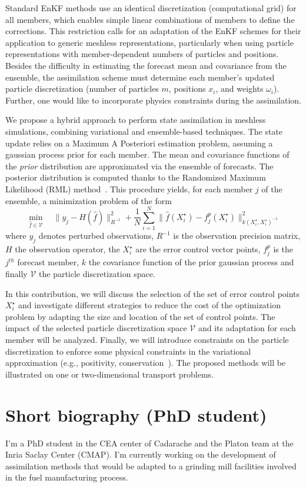 \documentclass[a4paper,10pt,oneside]{article}
\newcommand{\xs}{X^\star}
\begin{document}
Standard EnKF methods use an identical discretization (computational grid) for all members, which enables simple linear combinations of members to define the corrections. This restriction calls for an adaptation of the EnKF schemes for their application to generic meshless representations, particularly when using particle representations with member-dependent numbers of particles and positions. Besides the difficulty in estimating the forecast mean and covariance from the ensemble, the assimilation scheme must determine each member's updated particle discretization (number of particles $m$, positions $x_i$, and weights $\omega_i$). Further, one would like to incorporate physics constraints during the assimilation.

We propose a hybrid approach to perform state assimilation in meshless simulations, combining variational and ensemble-based techniques. The state update relies on a Maximum A Posteriori estimation problem, assuming a gaussian process prior for each member.
The mean and covariance functions of the \textit{prior} distribution are approximated via the ensemble of forecasts. The posterior distribution is computed thanks to the Randomized Maximum Likelihood (RML) method~\cite{evensen_data_2022}. This procedure yields, for each member $j$ of the ensemble, a minimization problem of the form
\begin{equation*}
  \min_{\hat{f} \in \mathcal{V}} \quad \|y_j - H(\hat{f})\|_{R^{-1}}^2 + \frac{1}{N} \sum_{i=1}^N \|\hat{f}(\xs_i)- f^p_{j}(\xs_i)\|^2_{k(\xs_i,\xs_i)^{-1}}
\end{equation*}
where $y_j$ denotes perturbed observations, $R^{-1}$ is the observation precision matrix, $H$ the observation operator, the $\xs_i$ are the error control vector points, $f^p_{j}$ is the $j^{th}$ forecast member, $k$ the covariance function of the prior gaussian process and finally $\mathcal{V}$ the particle discretization space.

In this contribution, we will discuss the selection of the set of error control points $\xs_i$ and investigate different strategies to reduce the cost of the optimization problem by adapting the size and location of the set of control points. The impact of the selected particle discretization space $\mathcal V$ and its adaptation for each member will be analyzed.
Finally, we will introduce constraints on the particle discretization to enforce some physical constraints in the variational approximation (e.g., positivity, conservation~\cite{albers_ensemble_2019}).
The proposed methods will be illustrated on one or two-dimensional transport problems.

\section*{Short biography (PhD student)}

I'm a PhD student in the CEA center of Cadarache and the Platon team at the Inria Saclay Center (CMAP). I'm currently working on the development of assimilation methods that would be adapted to a grinding mill facilities involved in the fuel manufacturing process.



\end{document}
